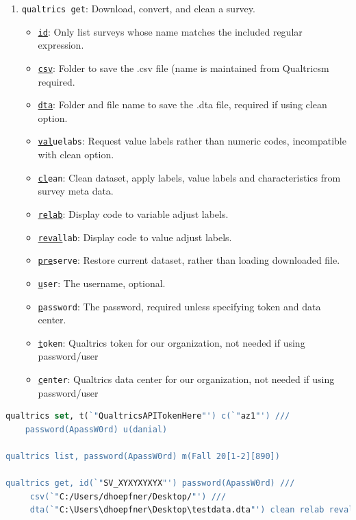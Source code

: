 \documentclass[11pt]{article}
\begin{document}
{\begin{enumerate}
\begin{itemize}
\end{itemize}
\item \texttt{qualtrics get}: Download, convert, and clean a survey.
\begin{itemize}
\item \texttt{\underline{id}}: Only list surveys whose name matches the included regular expression.
\item \texttt{\underline{csv}}: Folder to save the .csv file (name is maintained from Qualtricsm required.
\item \texttt{\underline{dta}}: Folder and file name to save the .dta file, required if using clean option.
\item \texttt{\underline{val}uelabs}: Request value labels rather than numeric codes, incompatible with clean option.
\item \texttt{\underline{cl}ean}: Clean dataset, apply labels, value labels and characteristics from survey meta data.
\item \texttt{\underline{relab}}: Display code to variable adjust labels.
\item \texttt{\underline{reval}lab}: Display code to value adjust labels.
\item \texttt{\underline{pre}serve}: Restore current dataset, rather than loading downloaded file.
\item \texttt{\underline{u}ser}: The username, optional.
\item \texttt{\underline{p}assword}: The password, required unless specifying token and data center.
\item \texttt{\underline{t}oken}: Qualtrics token for our organization, not needed if using password/user
\item \texttt{\underline{c}enter}: Qualtrics data center for our organization, not needed if using password/user
\end{itemize}

\end{enumerate}

\begin{lstlisting}[language=Stata, numbers=none]
qualtrics set, t(`"QualtricsAPITokenHere"') c(`"az1"') ///
	password(ApassW0rd) u(danial)

qualtrics list, password(ApassW0rd) m(Fall 20[1-2][890])

qualtrics get, id(`"SV_XYXYXYXYX"') password(ApassW0rd) ///
     csv(`"C:/Users/dhoepfner/Desktop/"') ///
     dta(`"C:\Users\dhoepfner\Desktop\testdata.dta"') clean relab reval


\end{lstlisting}}
\end{document}
